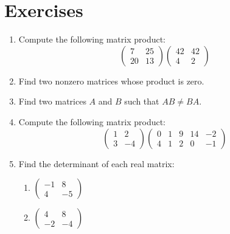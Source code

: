 \documentclass{book}
\theoremstyle{plain}
\theoremstyle{definition}
\newif\ifprintsolutions
\newcommand{\solution}[1]{\ifprintsolutions \begin{sloppypar}{\it #1}\end{sloppypar} \fi} %
\begin{document}
\section{Exercises}
\begin{enumerate}
\item Compute the following matrix product: $$\begin{pmatrix} 7 & 25 \\ 20 & 13 \end{pmatrix} \begin{pmatrix} 42 & 42 \\ 4 & 2 \end{pmatrix}$$ \solution{The product is $\begin{pmatrix} 394 & 344 \\ 892 & 866 \end{pmatrix}$.}
\item Find two nonzero matrices whose product is zero. \solution{One set is $\begin{pmatrix} 1 & 0 \\ 0 & 0 \end{pmatrix}$ and $\begin{pmatrix} 0 & 0 \\ 0 & 1 \end{pmatrix}$.}
\item Find two matrices $A$ and $B$ such that $AB \neq BA$. \solution{Almost any set of two matrices will work.}
\item Compute the following matrix product: $$\begin{pmatrix} 1 & 2 \\ 3 & -4 \end{pmatrix} \begin{pmatrix} 0 & 1 & 9 & 14 & -2 \\ 4 & 1 & 2 & 0 & -1 \end{pmatrix}$$ \solution{The product is $\begin{pmatrix} 8 & 3 & 13 & 14 & -4 \\ 4 & 1 & 2 & 0 & -1 \end{pmatrix}$.}
\item Find the determinant of each real matrix:
\begin{enumerate}
\item $\begin{pmatrix} -1 & 8 \\ 4 & -5 \end{pmatrix}$ \solution{$-27$}
\item $\begin{pmatrix} 4 & 8 \\ -2 & -4 \end{pmatrix}$ \solution{$0$}

\end{enumerate}
\end{enumerate}
\end{document}
